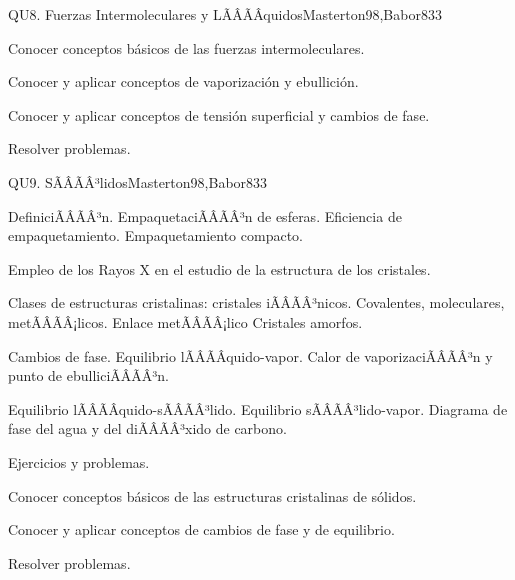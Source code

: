 \begin{sumilla}
\begin{unit}{QU8. Fuerzas Intermoleculares y LÃÂÃÂ­quidos}{Masterton98,Babor83}{3}
   \begin{objetivos}
      \item Conocer conceptos b\'asicos de las fuerzas intermoleculares.
      \item Conocer y aplicar conceptos de vaporizaci\'on y ebullici\'on.
      \item Conocer y aplicar conceptos de tensi\'on superficial y cambios de fase.
      \item Resolver problemas.
   \end{objetivos}
\end{unit}

\begin{unit}{QU9. SÃÂÃÂ³lidos}{Masterton98,Babor83}{3}
\begin{topicos}
      \item DefiniciÃÂÃÂ³n. EmpaquetaciÃÂÃÂ³n de esferas. Eficiencia de empaquetamiento. Empaquetamiento compacto.
      \item Empleo de los Rayos X en el estudio de la estructura de los cristales.
      \item Clases de estructuras cristalinas: cristales iÃÂÃÂ³nicos. Covalentes, moleculares, metÃÂÃÂ¡licos. Enlace metÃÂÃÂ¡lico Cristales amorfos.
      \item Cambios de fase. Equilibrio lÃÂÃÂ­quido-vapor. Calor de vaporizaciÃÂÃÂ³n y punto de ebulliciÃÂÃÂ³n.
      \item Equilibrio lÃÂÃÂ­quido-sÃÂÃÂ³lido. Equilibrio sÃÂÃÂ³lido-vapor. Diagrama de fase  del agua y del diÃÂÃÂ³xido de carbono.
      \item Ejercicios y problemas.
    \end{topicos}

   \begin{objetivos}
      \item Conocer conceptos b\'asicos de las estructuras cristalinas de s\'olidos.
      \item Conocer y aplicar conceptos de cambios de fase y de equilibrio.
      \item Resolver problemas.
   \end{objetivos}
\end{unit}


\end{sumilla}
